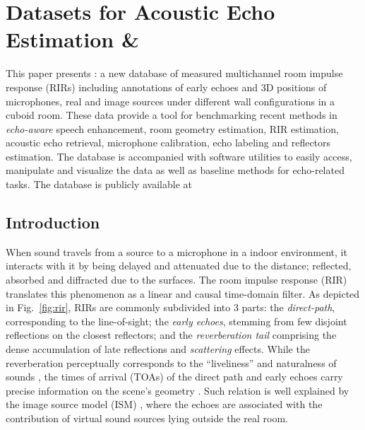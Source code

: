 \chapter{Datasets for Acoustic Echo Estimation \& \dechorate}\label{chap:ch:dechorate}

\vspace{-2.5em}

This paper presents \dEchorate{}: a new database of measured multichannel room impulse response (RIRs) including annotations of early echoes and 3D positions of microphones, real and image sources under different wall configurations in a cuboid room.
These data provide a tool for benchmarking recent methods in \textit{echo-aware} speech enhancement, room geometry estimation, RIR estimation, acoustic echo retrieval, microphone calibration, echo labeling and reflectors estimation.
The database is accompanied with software utilities to easily access, manipulate and visualize the data as well as baseline methods for echo-related tasks. The database is publicly available at \linkDechorate

\section{Introduction}\label{sec:dechorate:intro}

When sound travels from a source to a microphone in a indoor environment, it interacts with it by being delayed and attenuated due to the distance; reflected, absorbed and diffracted due to the surfaces. The room impulse response (RIR) translates this phenomenon as a linear and causal time-domain filter.
As depicted in Fig.~\ref{fig:rir}, RIRs are commonly subdivided into 3 parts:
the \textit{direct-path}, corresponding to the line-of-sight; the \textit{early echoes}, stemming from few disjoint reflections on the closest reflectors; and the \textit{reverberation tail} comprising the dense accumulation of late reflections and  \textit{scattering} effects. While the reverberation perceptually corresponds to the ``liveliness'' and naturalness of sounds \cite{geldard1953human}, the times of arrival (TOAs) of the direct path and early echoes carry precise information on the scene's geometry \cite{Kuttruff2009room}. Such relation is well explained by the image source model (ISM) \cite{Allen1979image}, where the echoes are associated with the contribution of virtual sound sources lying outside the real room.

